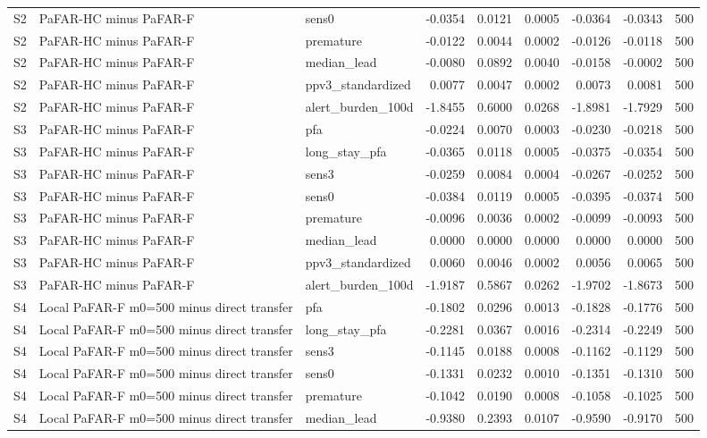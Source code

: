 \begin{table}[tbp]
{\begin{tabular}{lllrrrrrr}
S2 & PaFAR-HC minus PaFAR-F & sens0 & -0.0354 & 0.0121 & 0.0005 & -0.0364 & -0.0343 & 500 \\
S2 & PaFAR-HC minus PaFAR-F & premature & -0.0122 & 0.0044 & 0.0002 & -0.0126 & -0.0118 & 500 \\
S2 & PaFAR-HC minus PaFAR-F & median\_lead & -0.0080 & 0.0892 & 0.0040 & -0.0158 & -0.0002 & 500 \\
S2 & PaFAR-HC minus PaFAR-F & ppv3\_standardized & 0.0077 & 0.0047 & 0.0002 & 0.0073 & 0.0081 & 500 \\
S2 & PaFAR-HC minus PaFAR-F & alert\_burden\_100d & -1.8455 & 0.6000 & 0.0268 & -1.8981 & -1.7929 & 500 \\
S3 & PaFAR-HC minus PaFAR-F & pfa & -0.0224 & 0.0070 & 0.0003 & -0.0230 & -0.0218 & 500 \\
S3 & PaFAR-HC minus PaFAR-F & long\_stay\_pfa & -0.0365 & 0.0118 & 0.0005 & -0.0375 & -0.0354 & 500 \\
S3 & PaFAR-HC minus PaFAR-F & sens3 & -0.0259 & 0.0084 & 0.0004 & -0.0267 & -0.0252 & 500 \\
S3 & PaFAR-HC minus PaFAR-F & sens0 & -0.0384 & 0.0119 & 0.0005 & -0.0395 & -0.0374 & 500 \\
S3 & PaFAR-HC minus PaFAR-F & premature & -0.0096 & 0.0036 & 0.0002 & -0.0099 & -0.0093 & 500 \\
S3 & PaFAR-HC minus PaFAR-F & median\_lead & 0.0000 & 0.0000 & 0.0000 & 0.0000 & 0.0000 & 500 \\
S3 & PaFAR-HC minus PaFAR-F & ppv3\_standardized & 0.0060 & 0.0046 & 0.0002 & 0.0056 & 0.0065 & 500 \\
S3 & PaFAR-HC minus PaFAR-F & alert\_burden\_100d & -1.9187 & 0.5867 & 0.0262 & -1.9702 & -1.8673 & 500 \\
S4 & Local PaFAR-F m0=500 minus direct transfer & pfa & -0.1802 & 0.0296 & 0.0013 & -0.1828 & -0.1776 & 500 \\
S4 & Local PaFAR-F m0=500 minus direct transfer & long\_stay\_pfa & -0.2281 & 0.0367 & 0.0016 & -0.2314 & -0.2249 & 500 \\
S4 & Local PaFAR-F m0=500 minus direct transfer & sens3 & -0.1145 & 0.0188 & 0.0008 & -0.1162 & -0.1129 & 500 \\
S4 & Local PaFAR-F m0=500 minus direct transfer & sens0 & -0.1331 & 0.0232 & 0.0010 & -0.1351 & -0.1310 & 500 \\
S4 & Local PaFAR-F m0=500 minus direct transfer & premature & -0.1042 & 0.0190 & 0.0008 & -0.1058 & -0.1025 & 500 \\
S4 & Local PaFAR-F m0=500 minus direct transfer & median\_lead & -0.9380 & 0.2393 & 0.0107 & -0.9590 & -0.9170 & 500 \\

\end{tabular}}
\end{table}

